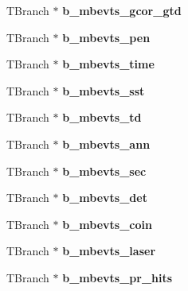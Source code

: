 \begin{DoxyCompactItemize}
\item 
\hypertarget{classg__clx_af3eb18cba48802757fe342cd7f04d15b}{T\-Branch $\ast$ {\bfseries b\-\_\-mbevts\-\_\-gcor\-\_\-gtd}}\label{classg__clx_af3eb18cba48802757fe342cd7f04d15b}

\item 
\hypertarget{classg__clx_a798da42e3e08624f65e7a62e72768731}{T\-Branch $\ast$ {\bfseries b\-\_\-mbevts\-\_\-pen}}\label{classg__clx_a798da42e3e08624f65e7a62e72768731}

\item 
\hypertarget{classg__clx_a4d33de820956789eb93800fdc7ac810d}{T\-Branch $\ast$ {\bfseries b\-\_\-mbevts\-\_\-time}}\label{classg__clx_a4d33de820956789eb93800fdc7ac810d}

\item 
\hypertarget{classg__clx_a336653d8862dabf46279816252cd9a67}{T\-Branch $\ast$ {\bfseries b\-\_\-mbevts\-\_\-sst}}\label{classg__clx_a336653d8862dabf46279816252cd9a67}

\item 
\hypertarget{classg__clx_a11241953b3c0bfb60e12b5e958c33000}{T\-Branch $\ast$ {\bfseries b\-\_\-mbevts\-\_\-td}}\label{classg__clx_a11241953b3c0bfb60e12b5e958c33000}

\item 
\hypertarget{classg__clx_a68936e16782c4be67cd3c4ce8eae7132}{T\-Branch $\ast$ {\bfseries b\-\_\-mbevts\-\_\-ann}}\label{classg__clx_a68936e16782c4be67cd3c4ce8eae7132}

\item 
\hypertarget{classg__clx_a8a0b2b747bcfca112170739a6bd7d51e}{T\-Branch $\ast$ {\bfseries b\-\_\-mbevts\-\_\-sec}}\label{classg__clx_a8a0b2b747bcfca112170739a6bd7d51e}

\item 
\hypertarget{classg__clx_a73c68a34850432a3402d572e91973f98}{T\-Branch $\ast$ {\bfseries b\-\_\-mbevts\-\_\-det}}\label{classg__clx_a73c68a34850432a3402d572e91973f98}

\item 
\hypertarget{classg__clx_aea150013c3823082bf94c6fe7c92c643}{T\-Branch $\ast$ {\bfseries b\-\_\-mbevts\-\_\-coin}}\label{classg__clx_aea150013c3823082bf94c6fe7c92c643}

\item 
\hypertarget{classg__clx_a654f79962aec1454c9e297b89f3a8beb}{T\-Branch $\ast$ {\bfseries b\-\_\-mbevts\-\_\-laser}}\label{classg__clx_a654f79962aec1454c9e297b89f3a8beb}

\item 
\hypertarget{classg__clx_a8604c42bddbbf63ea8cf7f3e1af36cf3}{T\-Branch $\ast$ {\bfseries b\-\_\-mbevts\-\_\-pr\-\_\-hits}}\label{classg__clx_a8604c42bddbbf63ea8cf7f3e1af36cf3}


\end{DoxyCompactItemize}
